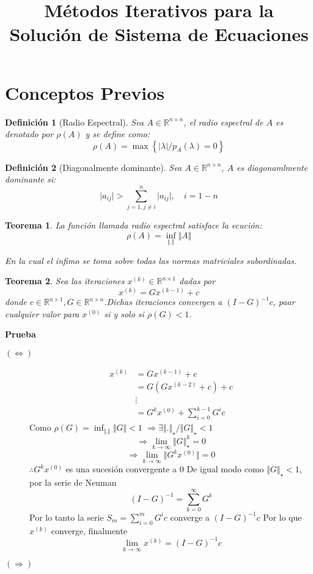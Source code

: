 \documentclass[11pt,a4paper]{article}
\title{Métodos Iterativos para la Solución de Sistema de Ecuaciones}
\newtheorem{mydef}{Definición}[section]
\newtheorem{mytheo}{Teorema}[section]
\newcommand{\re}{\mathbb{R}}
\newcommand{\ds}{\displaystyle}
\begin{document}
\maketitle

\section{Conceptos Previos}
\begin{mydef}[Radio Espectral]
	Sea $A\in\re^{n\times n}$, el radio espectral de $A$ es denotado por $\rho (A)	$ y se define como:
	$$\rho (A) = \max\left\{\vert\lambda\vert /p_{A}(\lambda) = 0\right\}$$\end{mydef}

\begin{mydef}[Diagonalmente dominante]
	Sea $A\in\re^{n\times n}$, $A$ es diagonamlmente dominante si:
		$$\vert a_{ij}\vert > \sum_{j=1, j\neq i}^{n}\vert a_{ij}\vert,\quad i=1-n$$
\end{mydef}

\begin{mytheo}
	La  función llamada radio espectral satisface la ecución:
	$$\rho (A) = \inf_{\Vert .\Vert}\Vert A\Vert$$
	
	En la cual	el infimo se toma sobre todas las normas matriciales subordinadas.
\end{mytheo}

\begin{mytheo}
	Sea las iteraciones $x^{(k)}\in\re^{n\times 1}$ dadas por
	$$x^{(k)} = Gx^{(k-1)}+c$$
	donde $c\in \re^{n\times 1}, G\in\re^{n\times n}$.Dichas iteraciones convergen a $(I-G)^{-1}c$, paar cualquier valor para $x^{(0)}$ si y solo si $\rho (G) < 1$.
\end{mytheo}

\textbf{Prueba}\\
\begin{description}
	\item[$(\Leftrightarrow)$]
		\begin{align*}
			x^{(k)} &= Gx^{(k-1)} +c\\
	 			&= G\left(Gx^{(k-2)}+c\right)+c\\
	 			&\vdots\\
	 			&= G^{k}x^{(0)} + \ds\sum_{i=0}^{k-1}G^{i}c
		\end{align*}
		Como $\rho (G) = \inf_{\Vert .\Vert}\Vert G\Vert < 1$
		$\Rightarrow\exists\Vert .\Vert_{\star}/\Vert G\Vert_{\star} <1$
		$$\Rightarrow\lim_{k\rightarrow\infty}\Vert G\Vert_{\star}^{k} = 0$$
		$$\Rightarrow\lim_{k\rightarrow\infty}\Vert G^{k}x^{(0)}\Vert =0$$
		$\therefore G^{k}x^{(0)}$ es una sucesión convergente a $0$
		De igual modo como $\Vert G\Vert_{\star} < 1$, por la serie de Neuman
		$$(I-G)^{-1} = \sum_{k=0}^{\infty}G^{k}$$
		Por lo tanto la serie $S_{m} = \ds\sum_{i=0}^{m}G^{i}c$ converge a $(I-G)^{-1}c$
		Por lo que $x^{(k)}$ converge, finalmente
		$$\lim_{k\rightarrow\infty}x^{(k)} = (I-G)^{-1}c$$
	\item[$(\Rightarrow)$] 
\end{description}
\end{document}
